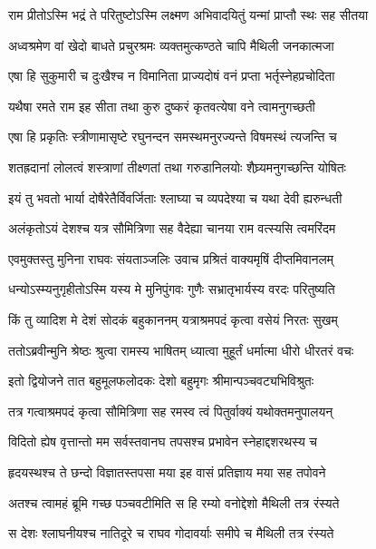 \twolineshloka
{राम प्रीतोऽस्मि भद्रं ते परितुष्टोऽस्मि लक्ष्मण}
{अभिवादयितुं यन्मां प्राप्तौ स्थः सह सीतया} %

\twolineshloka
{अध्वश्रमेण वां खेदो बाधते प्रचुरश्रमः}
{व्यक्तमुत्कण्ठते चापि मैथिली जनकात्मजा} %

\twolineshloka
{एषा हि सुकुमारी च दुःखैश्च न विमानिता}
{प्राज्यदोषं वनं प्रप्ता भर्तृस्नेहप्रचोदिता} %

\twolineshloka
{यथैषा रमते राम इह सीता तथा कुरु}
{दुष्करं कृतवत्येषा वने त्वामनुगच्छती} %

\twolineshloka
{एषा हि प्रकृतिः स्त्रीणामासृष्टे रघुनन्दन}
{समस्थमनुरज्यन्ते विषमस्थं त्यजन्ति च} %

\twolineshloka
{शतह्रदानां लोलत्वं शस्त्राणां तीक्ष्णतां तथा}
{गरुडानिलयोः शैघ्र्यमनुगच्छन्ति योषितः} %

\twolineshloka
{इयं तु भवतो भार्या दोषैरेतैर्विवर्जिताः}
{श्लाघ्या च व्यपदेश्या च यथा देवी ह्यरुन्धती} %

\twolineshloka
{अलंकृतोऽयं देशश्च यत्र सौमित्रिणा सह}
{वैदेह्या चानया राम वत्स्यसि त्वमरिंदम} %

\twolineshloka
{एवमुक्तस्तु मुनिना राघवः संयताञ्जलिः}
{उवाच प्रश्रितं वाक्यमृषिं दीप्तमिवानलम्} %

\twolineshloka
{धन्योऽस्म्यनुगृहीतोऽस्मि यस्य मे मुनिपुंगवः}
{गुणैः सभ्रातृभार्यस्य वरदः परितुष्यति} %

\twolineshloka
{किं तु व्यादिश मे देशं सोदकं बहुकाननम्}
{यत्राश्रमपदं कृत्वा वसेयं निरतः सुखम्} %

\twolineshloka
{ततोऽब्रवीन्मुनि श्रेष्ठः श्रुत्वा रामस्य भाषितम्}
{ध्यात्वा मुहूर्तं धर्मात्मा धीरो धीरतरं वचः} %

\twolineshloka
{इतो द्वियोजने तात बहुमूलफलोदकः}
{देशो बहुमृगः श्रीमान्पञ्चवट्यभिविश्रुतः} %

\twolineshloka
{तत्र गत्वाश्रमपदं कृत्वा सौमित्रिणा सह}
{रमस्व त्वं पितुर्वाक्यं यथोक्तमनुपालयन्} %

\twolineshloka
{विदितो ह्येष वृत्तान्तो मम सर्वस्तवानघ}
{तपसश्च प्रभावेन स्नेहाद्दशरथस्य च} %

\twolineshloka
{हृदयस्थश्च ते छन्दो विज्ञातस्तपसा मया}
{इह वासं प्रतिज्ञाय मया सह तपोवने} %

\twolineshloka
{अतश्च त्वामहं ब्रूमि गच्छ पञ्चवटीमिति}
{स हि रम्यो वनोद्देशो मैथिली तत्र रंस्यते} %

\twolineshloka
{स देशः श्लाघनीयश्च नातिदूरे च राघव}
{गोदावर्याः समीपे च मैथिली तत्र रंस्यते} %

